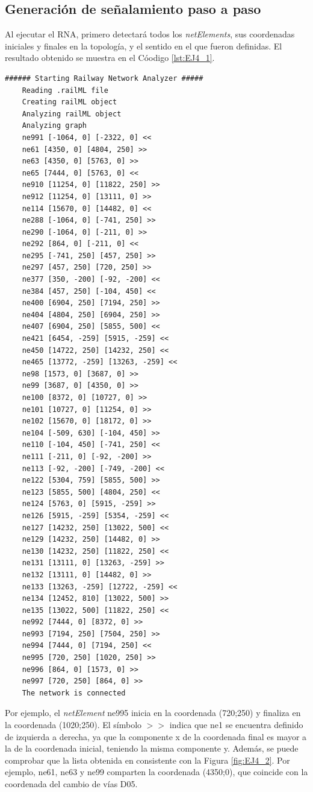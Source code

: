 \subsection{Generación de señalamiento paso a paso}

Al ejecutar el RNA, primero detectará todos los \textit{netElements}, sus coordenadas iniciales y finales en la topología, y el sentido en el que fueron definidas. El resultado obtenido se muestra en el Cóodigo \ref{lst:EJ4_1}.

\begin{lstlisting}[language = {}, tabsize=4, basicstyle=\footnotesize\ttfamily, showspaces=false, showstringspaces=false, caption = Detección de \textit{netElements} por parte del RNA , label = {lst:EJ4_1}]
	###### Starting Railway Network Analyzer #####
	Reading .railML file
	Creating railML object
	Analyzing railML object
	Analyzing graph
	ne991 [-1064, 0] [-2322, 0] <<
	ne61 [4350, 0] [4804, 250] >> 
	ne63 [4350, 0] [5763, 0] >>
	ne65 [7444, 0] [5763, 0] <<
	ne910 [11254, 0] [11822, 250] >>
	ne912 [11254, 0] [13111, 0] >>
	ne114 [15670, 0] [14482, 0] <<
	ne288 [-1064, 0] [-741, 250] >>
	ne290 [-1064, 0] [-211, 0] >>
	ne292 [864, 0] [-211, 0] <<
	ne295 [-741, 250] [457, 250] >>
	ne297 [457, 250] [720, 250] >>
	ne377 [350, -200] [-92, -200] <<
	ne384 [457, 250] [-104, 450] <<
	ne400 [6904, 250] [7194, 250] >>
	ne404 [4804, 250] [6904, 250] >>
	ne407 [6904, 250] [5855, 500] <<
	ne421 [6454, -259] [5915, -259] <<
	ne450 [14722, 250] [14232, 250] <<
	ne465 [13772, -259] [13263, -259] <<
	ne98 [1573, 0] [3687, 0] >>
	ne99 [3687, 0] [4350, 0] >>
	ne100 [8372, 0] [10727, 0] >>
	ne101 [10727, 0] [11254, 0] >>
	ne102 [15670, 0] [18172, 0] >>
	ne104 [-509, 630] [-104, 450] >>
	ne110 [-104, 450] [-741, 250] <<
	ne111 [-211, 0] [-92, -200] >>
	ne113 [-92, -200] [-749, -200] <<
	ne122 [5304, 759] [5855, 500] >>
	ne123 [5855, 500] [4804, 250] <<
	ne124 [5763, 0] [5915, -259] >>
	ne126 [5915, -259] [5354, -259] <<
	ne127 [14232, 250] [13022, 500] <<
	ne129 [14232, 250] [14482, 0] >>
	ne130 [14232, 250] [11822, 250] <<
	ne131 [13111, 0] [13263, -259] >>
	ne132 [13111, 0] [14482, 0] >>
	ne133 [13263, -259] [12722, -259] <<
	ne134 [12452, 810] [13022, 500] >>
	ne135 [13022, 500] [11822, 250] <<
	ne992 [7444, 0] [8372, 0] >>
	ne993 [7194, 250] [7504, 250] >>
	ne994 [7444, 0] [7194, 250] <<
	ne995 [720, 250] [1020, 250] >>
	ne996 [864, 0] [1573, 0] >>
	ne997 [720, 250] [864, 0] >>
	The network is connected
\end{lstlisting}

Por ejemplo, el \textit{netElement} ne995 inicia en la coordenada (720;250) y finaliza en la coordenada (1020;250). El símbolo $>>$ indica que ne1 se encuentra definido de izquierda a derecha, ya que la componente x de la coordenada final es mayor a la de la coordenada inicial, teniendo la misma componente y. Además, se puede comprobar que la lista obtenida en consistente con la Figura \ref{fig:EJ4_2}. Por ejemplo, ne61, ne63 y ne99 comparten la coordenada (4350;0), que coincide con la coordenada del cambio de vías D05.

